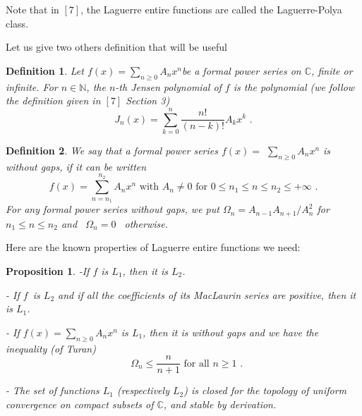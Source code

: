 \documentclass{article}
\newtheorem{definition}{Definition}
\newtheorem{proposition}[theorem]{Proposition}
\begin{document}
\bigskip Note that in $\left[ 7\right] $, the Laguerre entire functions are
called the Laguerre-Polya class.

Let us give two others definition that will be useful

\begin{definition}
\bigskip Let $f\left( x\right) =\sum_{n\geq 0}A_{n}x^{n}$be a formal power
series on $\mathbb{C}$, finite or infinite. For $n\in \mathbb{N}$, the $n$-th Jensen polynomial of $f$ is the polynomial (we follow the definition
given in $\left[ 7\right] $ Section 3) 
\begin{equation}
J_{n}\left( x\right) =\sum\limits_{k=0}^{n}\dfrac{n!}{\left( n-k\right) !}A_{k}x^{k}\text{ .}
\end{equation}
\end{definition}

\begin{definition}
We say that a formal power series $f\left( x\right) =$ $\sum_{n\geq
0}A_{n}x^{n}$ is without gaps, if it can be written 
\begin{equation*}
f\left( x\right) =\sum\limits_{n=n_{1}}^{n_{2}}A_{n}x^{n}\text{ with }A_{n}\neq 0\text{ \ \ for }0\leq n_{1}\leq n\leq n_{2}\leq +\infty \text{ .}
\end{equation*}
For any formal power series without gaps, we put $\Omega
_{n}=A_{n-1}A_{n+1}/A_{n}^{2}$ for $n_{1}\leq n\leq n_{2}$ and \ $\Omega
_{n}=0$ \ otherwise.
\end{definition}

\bigskip Here are the known properties of Laguerre entire functions we need:

\begin{proposition}
-If $f$ is $L_{1}$, then it is $L_{2}$.

\bigskip - If $f$\ is $L_{2}$ and if all the coefficients of its MacLaurin
series are positive, then it is $L_{1}$.

- If $f\left( x\right) =\sum_{n\geq 0}A_{n}x^{n}$ is $L_{1}$, then it is
without gaps and we have the inequality (of Turan) 
\begin{equation}
\text{\ \ \ \ }\Omega _{n}\leq \dfrac{n}{n+1}\text{ for all }n\geq 1\text{ .}
\end{equation}

- \bigskip The set of functions $L_{1}$ (respectively $L_{2}$) is closed for
the topology of uniform convergence on compact subsets of $\mathbb{C}$, and
stable by derivation.
\end{proposition}
\end{document}
